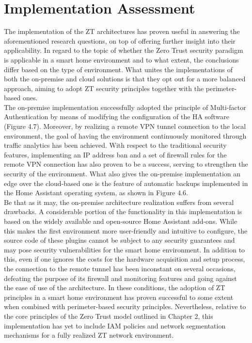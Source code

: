 \section{Implementation Assessment}
The implementation of the ZT architectures has proven useful in answering the aforementioned research questions, on top of offering further insight into their applicability.
In regard to the topic of whether the Zero Trust security paradigm is applicable in a smart home environment and to what extent, the conclusions differ based on the type of environment. What unites the implementations of both the on-premise and cloud solutions is that they opt out for a more balanced approach, aiming to adopt ZT security principles together with the perimeter-based ones.\\
The on-premise implementation successfully adopted the principle of Multi-factor Authentication by means of modifying the configuration of the HA software (Figure 4.7). Moreover, by realizing a remote VPN tunnel connection to the local environment, the goal of having the environment continuously monitored through traffic analytics has been achieved. With respect to the traditional security features, implementing an IP address ban and a set of firewall rules for the remote VPN connection has also proven to be a success, serving to strengthen the security of the environment. What also gives the on-premise implementation an edge over the cloud-based one is the feature of automatic backups implemented in the Home Assistant operating system, as shown in Figure 4.6.\\
Be that as it may, the on-premise architecture realization suffers from several drawbacks. A considerable portion of the functionality in this implementation is based on the widely available and open-source Home Assistant add-ons. While this makes the first environment more user-friendly and intuitive to configure, the source code of these plugins cannot be subject to any security guarantees and may pose security vulnerabilities for the smart home environment. In addition to this, even if one ignores the costs for the hardware acquisition and setup process, the connection to the remote tunnel has been inconstant on several occasions, defeating the purpose of its firewall and monitoring features and going against the ease of use of the architecture. In these conditions, the adoption of ZT principles in a smart home environment has proven successful to some extent when combined with perimeter-based security principles. Nevertheless, relative to the core principles of the Zero Trust model outlined in Chapter 2, this implementation has yet to include IAM policies and network segmentation mechanisms for a fully realized ZT network environment.\\
